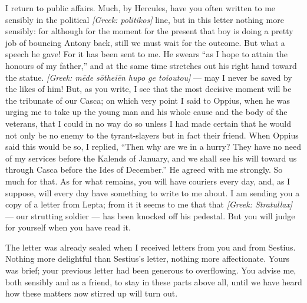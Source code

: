  I return to public affairs. Much, by Hercules, have you often written to me sensibly in the political \textit{[Greek: politikos]} line, but in this letter nothing more sensibly: for although \dag{}for the moment\dag{} for the present that boy is doing a pretty job of bouncing Antony back, still we must wait for the outcome. But what a speech he gave! For it has been sent to me. He swears ``as I hope to attain the honours of my father,'' and at the same time stretches out his right hand toward the statue. \textit{[Greek: mēde sōtheiēn hupo ge toioutou]} --- may I never be saved by the likes of him! But, as you write, I see that the most decisive moment will be the tribunate of our Casca; on which very point I said to Oppius, when he was urging me to take up the young man and his whole cause and the body of the veterans, that I could in no way do so unless I had made certain that he would not only be no enemy to the tyrant-slayers but in fact their friend. When Oppius said this would be so, I replied, ``Then why are we in a hurry? They have no need of my services before the Kalends of January, and we shall see his will toward us through Casca before the Ides of December.'' He agreed with me strongly. So much for that. As for what remains, you will have couriers every day, and, as I suppose, will every day have something to write to me about. I am sending you a copy of a letter from Lepta; from it it seems to me that that \textit{[Greek: Stratullax]} --- our strutting soldier --- has been knocked off his pedestal. But you will judge for yourself when you have read it.

 The letter was already sealed when I received letters from you and from Sestius. Nothing more delightful than Sestius's letter, nothing more affectionate. Yours was brief; your previous letter had been generous to overflowing. You advise me, both sensibly and as a friend, to stay in these parts above all, until we have heard how these matters now stirred up will turn out.

